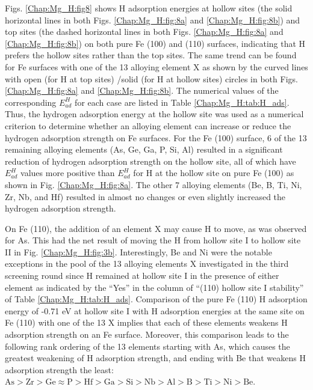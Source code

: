 Figs. \ref{Chap:Mg_H:fig8} shows H adsorption energies at hollow sites (the solid horizontal lines in both Figs. \ref{Chap:Mg_H:fig:8a} and \ref{Chap:Mg_H:fig:8b}) and top sites (the dashed horizontal lines in both Figs. \ref{Chap:Mg_H:fig:8a} and \ref{Chap:Mg_H:fig:8b}) on both pure Fe (100) and (110) surfaces, indicating that H prefers the hollow sites rather than the top sites. The same trend can be found for Fe surfaces with one of the 13 alloying element X as shown by the curved lines with open (for H at top sites) /solid (for H at hollow sites) circles in both Figs. \ref{Chap:Mg_H:fig:8a} and \ref{Chap:Mg_H:fig:8b}. The numerical values of the corresponding $E_{ad}^H$ for each case are listed in Table \ref{Chap:Mg_H:tab:H_ads}. Thus, the hydrogen adsorption energy at the hollow site was used as a numerical criterion to determine whether an alloying element can increase or reduce the hydrogen adsorption strength on Fe surfaces. For the Fe (100) surface, 6 of the 13 remaining alloying elements (As, Ge, Ga, P, Si, Al) resulted in a significant reduction of hydrogen adsorption strength on the hollow site, all of which have $E_{ad}^H$ values more positive than $E_{ad}^H$ for H at the hollow site on pure Fe (100) as shown in Fig. \ref{Chap:Mg_H:fig:8a}. The other 7 alloying elements (Be, B, Ti, Ni, Zr, Nb, and Hf) resulted in almost no changes or even slightly increased the hydrogen adsorption strength.

On Fe (110), the addition of an element X may cause H to move, as was observed for As. This had the net result of moving the H from hollow site I to hollow site II in Fig. \ref{Chap:Mg_H:fig:3b}. Interestingly, Be and Ni were the notable exceptions in the pool of the 13 alloying elements X investigated in the third screening round since H remained at hollow site I in the presence of either element as indicated by the ``Yes'' in the column of ``(110) hollow site I stability'' of Table \ref{Chap:Mg_H:tab:H_ads}. Comparison of the pure Fe (110) H adsorption energy of -0.71 eV at hollow site I with H adsorption energies at the same site on Fe (110) with one of the 13 X implies that each of these elements weakens H adsorption strength on an Fe surface. Moreover, this comparison leads to the following rank ordering of the 13 elements starting with As, which causes the greatest weakening of H adsorption strength, and ending with Be that weakens H adsorption strength the least: $\text{As} > \text{Zr} > \text{Ge} \approx \text{P} > \text{Hf} > \text{Ga} > \text{Si} > \text{Nb} > \text{Al} > \text{B} > \text{Ti} > \text{Ni} > \text{Be}$.

